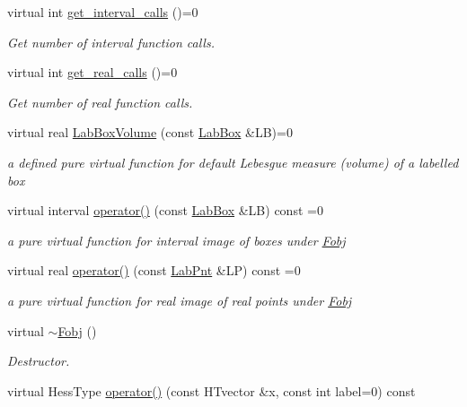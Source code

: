 \begin{DoxyCompactItemize}
\item 
virtual int \hyperlink{classFobj_a541c0edbb08855d1e3cdbb45b0aa26af}{get\-\_\-interval\-\_\-calls} ()=0
\begin{DoxyCompactList}\small\item\em \-Get number of interval function calls. \end{DoxyCompactList}\item 
virtual int \hyperlink{classFobj_a63df2521571faeb43663613a9a4611e7}{get\-\_\-real\-\_\-calls} ()=0
\begin{DoxyCompactList}\small\item\em \-Get number of real function calls. \end{DoxyCompactList}\item 
virtual real \hyperlink{classFobj_a8da39e1c8780124d6826742cdf21aaf5}{\-Lab\-Box\-Volume} (const \hyperlink{classLabBox}{\-Lab\-Box} \&\-L\-B)=0
\begin{DoxyCompactList}\small\item\em a defined pure virtual function for default \-Lebesgue measure (volume) of a labelled box \end{DoxyCompactList}\item 
virtual interval \hyperlink{classFobj_acf5ccd1fd7b302c8a1c77081b606a6ad}{operator()} (const \hyperlink{classLabBox}{\-Lab\-Box} \&\-L\-B) const =0
\begin{DoxyCompactList}\small\item\em a pure virtual function for interval image of boxes under \hyperlink{classFobj}{\-Fobj} \end{DoxyCompactList}\item 
virtual real \hyperlink{classFobj_a7e89aa4918cf8e40683dde607257d1ee}{operator()} (const \hyperlink{classLabPnt}{\-Lab\-Pnt} \&\-L\-P) const =0
\begin{DoxyCompactList}\small\item\em a pure virtual function for real image of real points under \hyperlink{classFobj}{\-Fobj} \end{DoxyCompactList}\item 
virtual \hyperlink{classFobj_a51d84b4865a42d81e4311a25546f846e}{$\sim$\-Fobj} ()
\begin{DoxyCompactList}\small\item\em \-Destructor. \end{DoxyCompactList}\item 
virtual \-Hess\-Type \hyperlink{classFobj_abe7df6a2da2b1d26915b41128d7693fe}{operator()} (const \-H\-Tvector \&x, const int label=0) const 

\end{DoxyCompactItemize}
